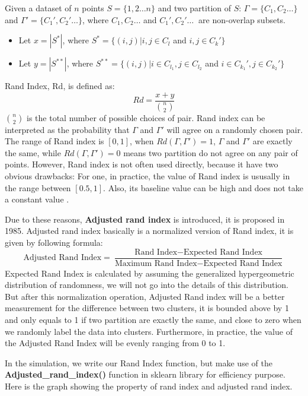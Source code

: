 \documentclass{uonmathreport}
\begin{document}
Given a dataset of $n$ points $S = \{1,2\ldots n\}$ and two partition of $S$: $\Gamma=\{C_1,C_2\ldots \}$ and $\Gamma' = \{C_1',C_2'\ldots\}$, where $C_1,C_2\ldots$ and $C_1',C_2'\ldots\ $ are non-overlap subsets. 
	\begin{itemize}
\item Let $x =|S^*|$, where $S^*=\{(i,j)|i,j\in C_l$ and $i,j\in C_k' \}$
  
\item Let $y =|S^{**}|$, where $S^{**}=\{(i,j)|i\in C_{l_1},j\in C_{l_2}$ and $i\in C_{k_1}',j\in C_{k_2}' \} $
\end{itemize}
Rand Index, Rd, is defined as:
\begin{equation}
 Rd = \frac{x+y}{{n\choose 2}}
\end{equation}
${n\choose 2}$ is the total number of possible choices of pair. Rand index can be interpreted as the probability that $\Gamma$ and $\Gamma'$ will agree on a randomly chosen pair. The range of Rand index is $[0,1]$, when $Rd(\Gamma,\Gamma') =1$, $\Gamma$ and $\Gamma'$ are exactly the same, while $Rd(\Gamma,\Gamma') =0$ means two partition do not agree on any pair of points. However, Rand index is not often used directly, because it have two obvious drawbacks: For one, in practice, the value of Rand index is ususally in the range between $[0.5,1]$. Also, its baseline value can be high and does not take a constant value \cite{vinh2010information}. 

Due to these reasons, \textbf{Adjusted rand index} is introduced, it is proposed in 1985\cite{hubert1985comparing}. Adjusted rand index basically is a normalized version of Rand index, it is given by following formula:
\begin{equation}
 \textrm{Adjusted Rand Index} =  \frac{\textrm{Rand Index}-\textrm{Expected Rand Index}}{\textrm{Maximum Rand Index}-\textrm{Expected Rand Index}}
\end{equation}
Expected Rand Index is calculated by assuming the generalized hypergeometric distribution of randomness, we will not go into the details of this distribution. But after this normalization operation, Adjusted Rand index will be a better measurement for the difference between two clusters, it is bounded above by 1 and only equals to 1 if two partition are exactly the same, and close to zero when we randomly label the data into clusters. Furthermore, in practice, the value of the Adjusted Rand Index will be evenly ranging from 0 to 1.

In the simulation, we write our Rand Index function, but make use of the \textbf{Adjusted\_rand\_index()} function in sklearn library for efficiency purpose. Here is the graph showing the property of rand index and adjusted rand index.
\end{document}
